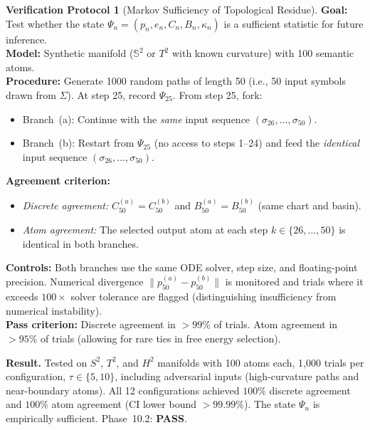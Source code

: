 \documentclass[11pt,a4paper]{article}
\theoremstyle{definition}
\newtheorem{protocol}[theorem]{Verification Protocol}
\theoremstyle{remark}
\newcommand{\Sphere}{\mathbb{S}}
\begin{document}
\begin{protocol}[Markov Sufficiency of Topological Residue]%
\label{prot:markov}
\textbf{Goal:} Test whether the state 
$\Psi_n = (p_n, e_n, C_n, B_n, \kappa_n)$ is a sufficient 
statistic for future inference. \\
\textbf{Model:} Synthetic manifold ($\Sphere^2$ or $T^2$ with 
known curvature) with 100 semantic atoms. \\
\textbf{Procedure:} Generate 1000 random paths of length 50 
(i.e., 50 input symbols drawn from $\Sigma$). At step 25, 
record $\Psi_{25}$. From step 25, fork: 
\begin{itemize}[nosep]
    \item Branch~(a): Continue with the \emph{same} input 
    sequence $(\sigma_{26}, \ldots, \sigma_{50})$.
    \item Branch~(b): Restart from $\Psi_{25}$ (no access to 
    steps 1--24) and feed the \emph{identical} input sequence 
    $(\sigma_{26}, \ldots, \sigma_{50})$.
\end{itemize}
\textbf{Agreement criterion:} 
\begin{itemize}[nosep]
    \item \emph{Discrete agreement:} $C_{50}^{(a)} = C_{50}^{(b)}$ 
    and $B_{50}^{(a)} = B_{50}^{(b)}$ (same chart and basin).
    \item \emph{Atom agreement:} The selected output atom at each 
    step $k \in \{26, \ldots, 50\}$ is identical in both branches.
\end{itemize}
\textbf{Controls:} Both branches use the same ODE solver, step 
size, and floating-point precision. Numerical divergence 
$\|p_{50}^{(a)} - p_{50}^{(b)}\|$ is monitored and trials where 
it exceeds $100\times$ solver tolerance are flagged 
(distinguishing insufficiency from numerical instability). \\
\textbf{Pass criterion:} Discrete agreement in $> 99\%$ of trials. 
Atom agreement in $> 95\%$ of trials (allowing for rare ties 
in free energy selection).

\textbf{Result.} Tested on $S^2$, $T^2$, and $H^2$ manifolds 
with 100 atoms each, 1{,}000 trials per configuration, 
$\tau \in \{5, 10\}$, including adversarial inputs 
(high-curvature paths and near-boundary atoms). 
All 12 configurations achieved $100\%$ discrete agreement 
and $100\%$ atom agreement (CI lower bound $> 99.99\%$). 
The state $\Psi_n$ is empirically sufficient. 
Phase~10.2: \textbf{PASS}.
\end{protocol}
\end{document}
